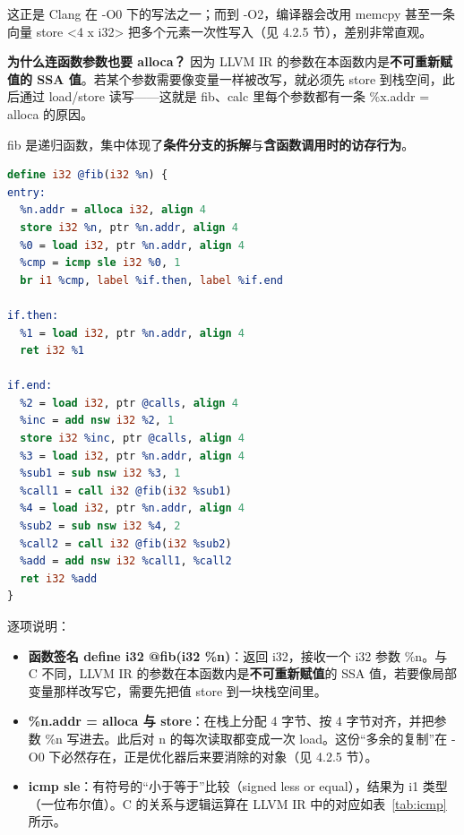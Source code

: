 \documentclass[UTF8,a4paper,10pt]{ctexart}
\newcommand{\hfour}[1]{\par\vspace{0.55em}\noindent{\bfseries #1}\par\vspace{0.25em}}
\begin{document}
这正是 Clang 在 -O0 下的写法之一；而到 -O2，编译器会改用 memcpy 甚至一条向量 store <4 x i32> 把多个元素一次性写入（见 4.2.5 节），差别非常直观。

\textbf{为什么连函数参数也要 alloca？} 因为 LLVM IR 的参数在本函数内是\textbf{不可重新赋值的 SSA 值}。若某个参数需要像变量一样被改写，就必须先 store 到栈空间，此后通过 load/store 读写——这就是 fib、calc 里每个参数都有一条 \%x.addr = alloca 的原因。

\hfour{5、函数 fib：条件分支与递归}

fib 是递归函数，集中体现了\textbf{条件分支的拆解}与\textbf{含函数调用时的访存行为}。

\begin{lstlisting}[language=LLVM]
define i32 @fib(i32 %n) {
entry:
  %n.addr = alloca i32, align 4
  store i32 %n, ptr %n.addr, align 4
  %0 = load i32, ptr %n.addr, align 4
  %cmp = icmp sle i32 %0, 1
  br i1 %cmp, label %if.then, label %if.end

if.then:
  %1 = load i32, ptr %n.addr, align 4
  ret i32 %1

if.end:
  %2 = load i32, ptr @calls, align 4
  %inc = add nsw i32 %2, 1
  store i32 %inc, ptr @calls, align 4
  %3 = load i32, ptr %n.addr, align 4
  %sub1 = sub nsw i32 %3, 1
  %call1 = call i32 @fib(i32 %sub1)
  %4 = load i32, ptr %n.addr, align 4
  %sub2 = sub nsw i32 %4, 2
  %call2 = call i32 @fib(i32 %sub2)
  %add = add nsw i32 %call1, %call2
  ret i32 %add
}
\end{lstlisting}

逐项说明：

\begin{itemize}
  \item \textbf{函数签名 define i32 @fib(i32 \%n)}：返回 i32，接收一个 i32 参数 \%n。与 C 不同，LLVM IR 的参数在本函数内是\textbf{不可重新赋值}的 SSA 值，若要像局部变量那样改写它，需要先把值 store 到一块栈空间里。
  \item \textbf{\%n.addr = alloca 与 store}：在栈上分配 4 字节、按 4 字节对齐，并把参数 \%n 写进去。此后对 n 的每次读取都变成一次 load。这份“多余的复制”在 -O0 下必然存在，正是优化器后来要消除的对象（见 4.2.5 节）。
  \item \textbf{icmp sle}：有符号的“小于等于”比较（signed less or equal），结果为 i1 类型（一位布尔值）。C 的关系与逻辑运算在 LLVM IR 中的对应如表~\ref{tab:icmp} 所示。
\end{itemize}
\end{document}
